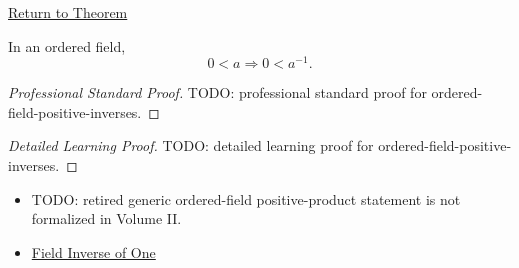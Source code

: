 \newpage
{}
\label{prf:ordered-field-positive-inverses}

\begin{remark*}[Return]
\hyperref[thm:reciprocal-reverses-order-on-positives-q]{Return to Theorem}
\end{remark*}

\begin{theorem*}
In an ordered field,
\[
0<a
\Longrightarrow
0<a^{-1}.
\]
\end{theorem*}

\begin{proof}[Professional Standard Proof]
\LRAProofBodyStart
TODO: professional standard proof for ordered-field-positive-inverses.
\end{proof}

\begin{proof}[Detailed Learning Proof]
\LRAProofBodyStart
TODO: detailed learning proof for ordered-field-positive-inverses.
\end{proof}

\begin{remark*}
\end{remark*}

\begin{dependencies}
\begin{itemize}
  \item TODO: retired generic ordered-field positive-product statement is not formalized in Volume II.
  \item \hyperref[thm:field-inverse-of-one]{Field Inverse of One}
\end{itemize}
\end{dependencies}

\clearpage
